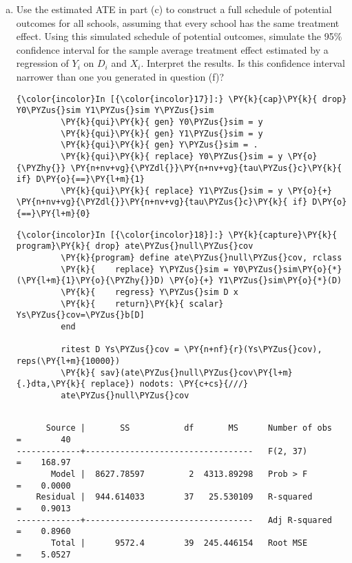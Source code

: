 \documentclass[11pt,notitlepage]{article}\usepackage[]{graphicx}\usepackage[]{color}
\makeatletter
\newenvironment{kframe}{%
 \def\at@end@of@kframe{}%
 \ifinner\ifhmode%
  \def\at@end@of@kframe{\end{minipage}}%
  \begin{minipage}{\columnwidth}%
 \fi\fi%
 \def\FrameCommand##1{\hskip\@totalleftmargin \hskip-\fboxsep
 \colorbox{shadecolor}{##1}\hskip-\fboxsep
     \hskip-\linewidth \hskip-\@totalleftmargin \hskip\columnwidth}%
 \MakeFramed {\advance\hsize-\width
   \@totalleftmargin\z@ \linewidth\hsize
   \@setminipage}}%
 {\par\unskip\endMakeFramed%
 \at@end@of@kframe}
\newenvironment{knitrout}{}{} %
\makeatother
\begin{document}
\begin{enumerate}[a)]
\item Use the estimated ATE in part (c) to construct a full schedule of potential outcomes for all schools, assuming that every school has the same treatment effect.  Using this simulated schedule of potential outcomes, simulate the 95\% confidence interval for the sample average treatment effect estimated by a regression of $Y_i$ on $D_i$ and $X_i$.  Interpret the results.  Is this confidence interval narrower than one you generated in question (f)?  

\begin{knitrout}
\color{fgcolor}\begin{kframe}
    \begin{Verbatim}[commandchars=\\\{\}]
{\color{incolor}In [{\color{incolor}17}]:} \PY{k}{cap}\PY{k}{ drop} Y0\PYZus{}sim Y1\PYZus{}sim Y\PYZus{}sim
         \PY{k}{qui}\PY{k}{ gen} Y0\PYZus{}sim = y
         \PY{k}{qui}\PY{k}{ gen} Y1\PYZus{}sim = y
         \PY{k}{qui}\PY{k}{ gen} Y\PYZus{}sim = .
         \PY{k}{qui}\PY{k}{ replace} Y0\PYZus{}sim = y \PY{o}{\PYZhy{}} \PY{n+nv+vg}{\PYZdl{}}\PY{n+nv+vg}{tau\PYZus{}c}\PY{k}{ if} D\PY{o}{==}\PY{l+m}{1}
         \PY{k}{qui}\PY{k}{ replace} Y1\PYZus{}sim = y \PY{o}{+} \PY{n+nv+vg}{\PYZdl{}}\PY{n+nv+vg}{tau\PYZus{}c}\PY{k}{ if} D\PY{o}{==}\PY{l+m}{0}
\end{Verbatim}

    \begin{Verbatim}[commandchars=\\\{\}]
{\color{incolor}In [{\color{incolor}18}]:} \PY{k}{capture}\PY{k}{ program}\PY{k}{ drop} ate\PYZus{}null\PYZus{}cov
         \PY{k}{program} define ate\PYZus{}null\PYZus{}cov, rclass
         \PY{k}{	replace} Y\PYZus{}sim = Y0\PYZus{}sim\PY{o}{*}(\PY{l+m}{1}\PY{o}{\PYZhy{}}D) \PY{o}{+} Y1\PYZus{}sim\PY{o}{*}(D) 
         \PY{k}{	regress} Y\PYZus{}sim D x
         \PY{k}{    return}\PY{k}{ scalar} Ys\PYZus{}cov=\PYZus{}b[D]	
         end
         
         ritest D Ys\PYZus{}cov = \PY{n+nf}{r}(Ys\PYZus{}cov), reps(\PY{l+m}{10000})
         \PY{k}{ sav}(ate\PYZus{}null\PYZus{}cov\PY{l+m}{.}dta,\PY{k}{ replace}) nodots: \PY{c+cs}{///}
         ate\PYZus{}null\PYZus{}cov
\end{Verbatim}

    \begin{Verbatim}[commandchars=\\\{\}]

      Source |       SS           df       MS      Number of obs   =        40
-------------+----------------------------------   F(2, 37)        =    168.97
       Model |  8627.78597         2  4313.89298   Prob > F        =    0.0000
    Residual |  944.614033        37   25.530109   R-squared       =    0.9013
-------------+----------------------------------   Adj R-squared   =    0.8960
       Total |      9572.4        39  245.446154   Root MSE        =    5.0527


\end{Verbatim}
\end{kframe}
\end{knitrout}
\end{enumerate}
\end{document}
